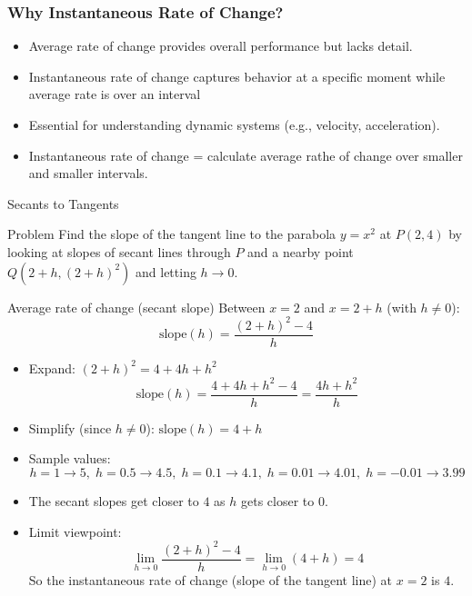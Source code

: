 \documentclass{beamer}
\begin{document}
\begin{frame}
\frametitle{Why Instantaneous Rate of Change?}
\begin{itemize}
  \item Average rate of change provides overall performance but lacks detail.
  \item Instantaneous rate of change captures behavior at a specific moment while average rate is over an interval
  \item Essential for understanding dynamic systems (e.g., velocity, acceleration).
  \item Instantaneous rate of change = calculate average rathe of change over smaller and smaller intervals.
\end{itemize}
\end{frame}
\begin{frame}{Secants to Tangents}
  \begin{block}{Problem}
    Find the slope of the tangent line to the parabola $y = x^{2}$ at $P(2,4)$ by looking at slopes of secant lines through $P$ and a nearby point $Q(2+h,(2+h)^{2})$ and letting $h \to 0$.
  \end{block}

  \begin{block}{Average rate of change (secant slope)}
    Between $x=2$ and $x=2+h$ (with $h \ne 0$):
    \[
      \text{slope}(h)=\frac{(2+h)^2 - 4}{h}
    \]
  \end{block}

  \begin{itemize}
    \item<2-> Expand: $(2+h)^2 = 4 + 4h + h^{2}$
      \[
        \text{slope}(h)=\frac{4+4h+h^{2}-4}{h}= \frac{4h+h^{2}}{h}
      \]
    \item<3-> Simplify (since $h \ne 0$): $\text{slope}(h)=4 + h$
    \item<4-> Sample values:
      \[
        h=1\!\to\!5,\; h=0.5\!\to\!4.5,\; h=0.1\!\to\!4.1,\; h=0.01\!\to\!4.01,\; h=-0.01\!\to\!3.99
      \]
    \item<5-> The secant slopes get closer to $4$ as $h$ gets closer to $0$.
    \item<6-> Limit viewpoint:
      \[
        \lim_{h\to 0} \frac{(2+h)^2 - 4}{h} = \lim_{h\to 0} (4 + h)=4
      \]
      So the instantaneous rate of change (slope of the tangent line) at $x=2$ is $4$.
  \end{itemize}
\end{frame}
\end{document}
